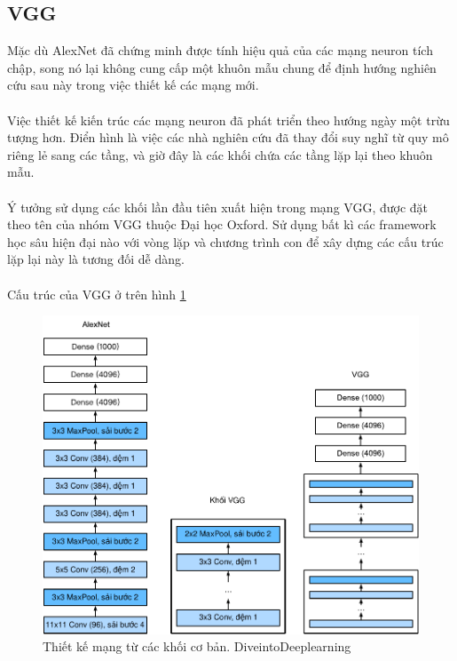 \documentclass{article}
\begin{document}
\subsection{VGG}
Mặc dù AlexNet đã chứng minh được tính hiệu quả của các mạng neuron tích chập, song nó lại không cung cấp một khuôn mẫu chung để định hướng nghiên cứu sau này trong việc thiết kế các mạng mới.\\\\
Việc thiết kế kiến trúc các mạng neuron đã phát triển theo hướng ngày một trừu tượng hơn. Điển hình là việc các nhà nghiên cứu đã thay đổi suy nghĩ từ quy mô riêng lẻ sang các tầng, và giờ đây là các khối chứa các tầng lặp lại theo khuôn mẫu.\\\\
Ý tưởng sử dụng các khối lần đầu tiên xuất hiện trong mạng VGG, được đặt theo tên của nhóm VGG thuộc Đại học Oxford. Sử dụng bất kì các framework học sâu hiện đại nào với vòng lặp và chương trình con để xây dựng các cấu trúc lặp lại này là tương đối dễ dàng.\\\\
Cấu trúc của VGG ở trên hình \ref{fig10}
\begin{figure}[ht!]
    \centering
    \includegraphics[width = 0.6\linewidth]{vgg.pdf}
    \caption{Thiết kế mạng từ các khối cơ bản. DiveintoDeeplearning}
    \label{fig10}
\end{figure}
\end{document}

